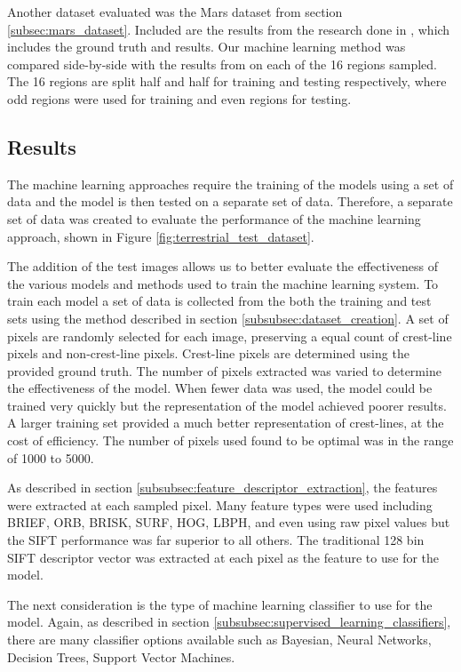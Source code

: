 Another dataset evaluated was the Mars dataset from section \ref{subsec:mars_dataset}. Included are the results from the research done in \cite{vaz_object_based_dune_analysis}, which includes the ground truth and results. Our machine learning method was compared side-by-side with the results from \cite{vaz_object_based_dune_analysis} on each of the 16 regions sampled. The 16 regions are split half and half for training and testing respectively, where odd regions were used for training and even regions for testing. 

\subsection{Results} \label{subsec:results-and-discussion}
The machine learning approaches require the training of the models using a set of data and the model is then tested on a separate set of data. Therefore, a separate set of data was created to evaluate the performance of the machine learning approach, shown in Figure \ref{fig:terrestrial_test_dataset}.


The addition of the test images allows us to better evaluate the effectiveness of the various models and methods used to train the machine learning system. To train each model a set of data is collected from the both the training and test sets using the method described in section \ref{subsubsec:dataset_creation}. A set of pixels are randomly selected for each image, preserving a equal count of crest-line pixels and non-crest-line pixels. Crest-line pixels are determined using the provided ground truth. The number of pixels extracted was varied to determine the effectiveness of the model. When fewer data was used, the model could be trained very quickly but the representation of the model achieved poorer results. A larger training set provided a much better representation of crest-lines, at the cost of efficiency. The number of pixels used found to be optimal was in the range of 1000 to 5000.

As described in section \ref{subsubsec:feature_descriptor_extraction}, the features were extracted at each sampled pixel. Many feature types were used including BRIEF, ORB, BRISK, SURF, HOG, LBPH, and even using raw pixel values but the SIFT performance was far superior to all others. The traditional 128 bin SIFT descriptor vector was extracted at each pixel as the feature to use for the model.

The next consideration is the type of machine learning classifier to use for the model. Again, as described in section \ref{subsubsec:supervised_learning_classifiers}, there are many classifier options available such as Bayesian, Neural Networks, Decision Trees, Support Vector Machines.

